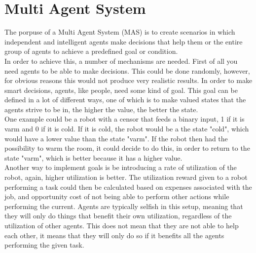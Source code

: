 \section{Multi Agent System}
The porpuse of a Multi Agent System (MAS) is to create scenarios in which independent and intelligent agents make decisions that help them or the entire group of agents to achieve a predefined goal or condition.\\
\indent In order to achieve this, a number of mechanisms are needed. First of all you need agents to be able to make decisions. This could be done randomly, however, for obvious reasons this would not produce very realistic results. In order to make smart decisions, agents, like people, need some kind of goal. This goal can be defined in a lot of different ways, one of which is to make valued states that the agents strive to be in, the higher the value, the better the state.\\
\indent One example could be a robot with a censor that feeds a binary input, 1 if it is varm and 0 if it is cold. If it is cold, the robot would be a the state "cold", which would have a lower value than the state "varm". If the robot then had the possibility to warm the room, it could decide to do this, in order to return to the state "varm", which is better because it has a higher value.\\
\indent Another way to implement goals is be introducing a rate of utilization of the robot, again, higher utilization is better. The utilization reward given to a robot performing a task could then be calculated based on expenses associated with the job, and opportunity cost of not being able to perform other actions while performing the current. Agents are typically selfish in this setup, meaning that they will only do things that benefit their own utilization, regardless of the utilization of other agents. This does not mean that they are not able to help each other, it means that they will only do so if it benefits all the agents performing the given task.